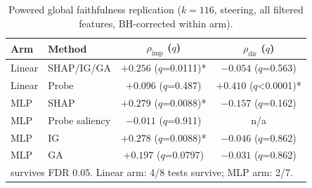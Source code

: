 \begin{table}[h!]
    \centering
    \caption{Powered global faithfulness replication ($k=116$, steering, all filtered features, BH-corrected within arm).}
    \label{tab:all-selection-faithfulness}
    \begin{tabular}{llcc}
    \toprule
    Arm & Method & $\rho_\text{imp}$ ($q$) & $\rho_\text{dir}$ ($q$) \\
    \midrule
    Linear & SHAP/IG/GA & $+0.256$ ($q$=0.0111)* & $-0.054$ ($q$=0.563) \\
    Linear & Probe      & $+0.096$ ($q$=0.487)  & $+0.410$ ($q$<0.0001)* \\
    \midrule
    MLP & SHAP           & $+0.279$ ($q$=0.0088)* & $-0.157$ ($q$=0.162) \\
    MLP & Probe saliency & $-0.011$ ($q$=0.911) & n/a \\
    MLP & IG             & $+0.278$ ($q$=0.0088)* & $-0.046$ ($q$=0.862) \\
    MLP & GA             & $+0.197$ ($q$=0.0797) & $-0.031$ ($q$=0.862) \\
    \bottomrule
    \multicolumn{4}{l}{\footnotesize *survives FDR 0.05. Linear arm: 4/8 tests survive; MLP arm: 2/7.}
    \end{tabular}
    \end{table}